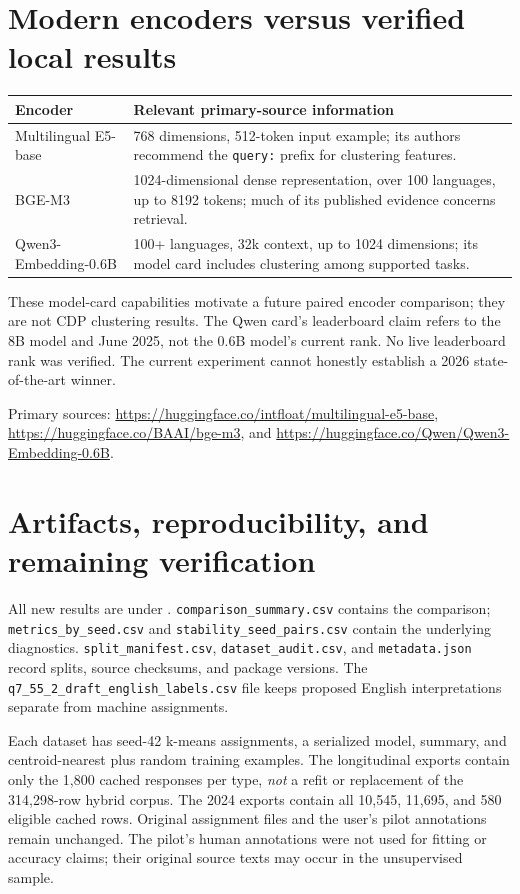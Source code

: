 \documentclass[11pt,a4paper]{article}
\begin{document}
\section{Modern encoders versus verified local results}
\begin{center}
\small
\begin{tabular}{lp{8.8cm}}
\toprule
Encoder & Relevant primary-source information \\
\midrule
Multilingual E5-base & 768 dimensions, 512-token input example; its authors
recommend the \texttt{query:} prefix for clustering features. \\
BGE-M3 & 1024-dimensional dense representation, over 100 languages,
up to 8192 tokens; much of its published evidence concerns retrieval. \\
Qwen3-Embedding-0.6B & 100+ languages, 32k context, up to 1024 dimensions;
its model card includes clustering among supported tasks. \\
\bottomrule
\end{tabular}
\end{center}
These model-card capabilities motivate a future paired encoder comparison;
they are not CDP clustering results. The Qwen card's leaderboard claim
refers to the 8B model and June 2025, not the 0.6B model's current rank.
No live leaderboard rank was verified. The current experiment cannot
honestly establish a 2026 state-of-the-art winner.

Primary sources:
\url{https://huggingface.co/intfloat/multilingual-e5-base},
\url{https://huggingface.co/BAAI/bge-m3}, and
\url{https://huggingface.co/Qwen/Qwen3-Embedding-0.6B}.

\section{Artifacts, reproducibility, and remaining verification}
All new results are under
.
\texttt{comparison\_summary.csv} contains the comparison;
\texttt{metrics\_by\_seed.csv} and
\texttt{stability\_seed\_pairs.csv} contain the underlying diagnostics.
\texttt{split\_manifest.csv}, \texttt{dataset\_audit.csv}, and
\texttt{metadata.json} record splits, source checksums, and package versions.
The \texttt{q7\_55\_2\_draft\_english\_labels.csv} file keeps proposed
English interpretations separate from machine assignments.

Each dataset has seed-42 k-means assignments, a serialized model, summary,
and centroid-nearest plus random training examples.
The longitudinal exports contain only the 1,800 cached responses per type,
\emph{not} a refit or replacement of the 314,298-row hybrid corpus.
The 2024 exports contain all 10,545, 11,695, and 580 eligible cached rows.
Original assignment files and the user's pilot annotations remain unchanged.
The pilot's human annotations were not used for fitting or accuracy claims;
their original source texts may occur in the unsupervised sample.
\end{document}
